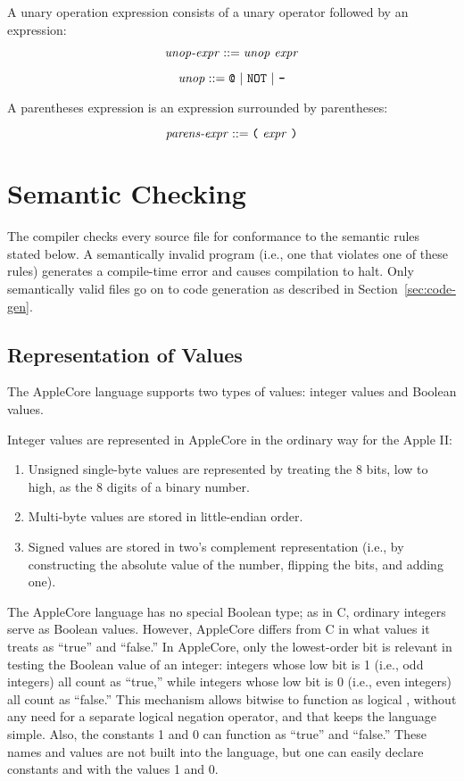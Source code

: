 \documentclass[10pt]{article}
\begin{document}
 A unary operation expression
consists of a unary operator followed by an expression:

$$\mbox{\textit{unop-expr}} ::= \mbox{\ensuremath{\mbox{\textit{unop}}} \ensuremath{\mbox{\textit{expr}}}}$$

$$\mbox{\textit{unop}} ::= \mbox{\texttt{@} $|$ \texttt{NOT} $|$ \texttt{-}}$$

 A parentheses expression is an
expression surrounded by parentheses:

$$\mbox{\textit{parens-expr}} ::= \mbox{\texttt{(} \ensuremath{\mbox{\textit{expr}}} \texttt{)}}$$

\section{Semantic Checking}
\label{sec:semantics}

The compiler checks every source file for conformance to the semantic
rules stated below.  A semantically invalid program (i.e., one that
violates one of these rules) generates a compile-time error and causes
compilation to halt.  Only semantically valid files go on to code
generation as described in Section~\ref{sec:code-gen}.

\subsection{Representation of Values}
\label{sec:semantics:values}

The AppleCore language supports two types of values: integer values
and Boolean values.

 Integer values are represented in AppleCore
in the ordinary way for the Apple II:
%
\begin{enumerate}
%
\item Unsigned single-byte values are represented by treating the 8
  bits, low to high, as the 8 digits of a binary number.
%
\item Multi-byte values are stored in little-endian order.
%
\item Signed values are stored in two's complement representation
  (i.e., by constructing the absolute value of the number, flipping
  the bits, and adding one).
%
\end{enumerate}

 The AppleCore language has no special Boolean
type; as in C, ordinary integers serve as Boolean values.  However,
AppleCore differs from C in what values it treats as ``true'' and
``false.''  In AppleCore, only the lowest-order bit is relevant in
testing the Boolean value of an integer: integers whose low bit is 1
(i.e., odd integers) all count as ``true,'' while integers whose low
bit is 0 (i.e., even integers) all count as ``false.''  This mechanism
allows bitwise  to function as logical , without any
need for a separate logical negation operator, and that keeps the
language simple.  Also, the constants 1 and 0 can function as ``true''
and ``false.''  These names and values are not built into the
language, but one can easily declare constants  and
 with the values 1 and 0.
\end{document}
